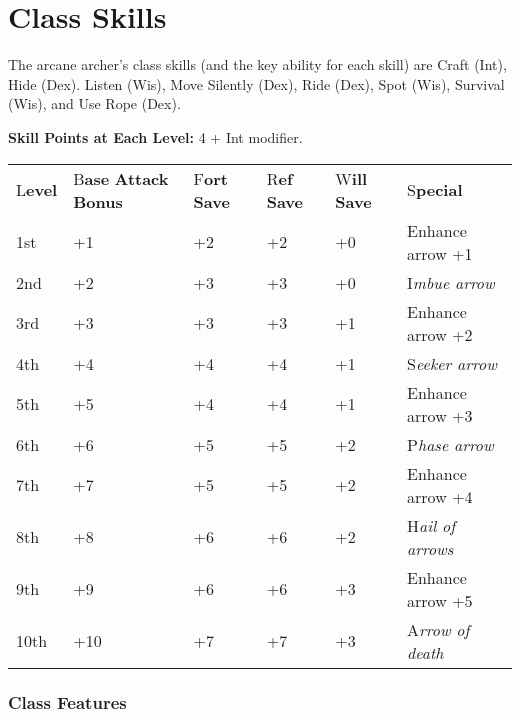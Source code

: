 \documentclass{article}
\begin{document}
\section*{\textbf{Class Skills}}

The arcane archer's class skills (and the key ability for each skill) are Craft 
(Int), Hide (Dex). Listen (Wis), Move Silently (Dex), Ride (Dex), Spot (Wis), Survival 
(Wis), and Use Rope (Dex).

\textbf{Skill Points at Each Level:} 4 + Int modifier.

\vspace{12pt}
\begin{tabular}{|>{\raggedright}p{29pt}|>{\raggedright}p{35pt}|>{\raggedright}p{23pt}|>{\raggedright}p{23pt}|>{\raggedright}p{23pt}|>{\raggedright}p{76pt}|}
\hline
\multicolumn{6}{|p{211pt}|}{\subsection*{T\textbf{able: The Arcane Archer}}}\tabularnewline
\hline
L\textbf{evel } & B\textbf{ase}\linebreak{}
\textbf{Attack}\linebreak{}
\textbf{Bonus} & F\textbf{ort}\linebreak{}
\textbf{Save} & R\textbf{ef}\linebreak{}
\textbf{Save} & W\textbf{ill}\linebreak{}
\textbf{Save} & S\textbf{pecial}\tabularnewline
\hline
1st & +1 & +2 & +2 & +0 & Enhance arrow +1\tabularnewline
\hline
2nd & +2 & +3 & +3 & +0 & I\textit{mbue arrow}\tabularnewline
\hline
3rd & +3 & +3 & +3 & +1 & Enhance arrow +2\tabularnewline
\hline
4th & +4 & +4 & +4 & +1 & S\textit{eeker arrow}\tabularnewline
\hline
5th & +5 & +4 & +4 & +1 & Enhance arrow +3\tabularnewline
\hline
6th & +6 & +5 & +5 & +2 & P\textit{hase arrow}\tabularnewline
\hline
7th & +7 & +5 & +5 & +2 & Enhance arrow +4\tabularnewline
\hline
8th & +8 & +6 & +6 & +2 & H\textit{ail of arrows}\tabularnewline
\hline
9th & +9 & +6 & +6 & +3 & Enhance arrow +5\tabularnewline
\hline
10th & +10 & +7 & +7 & +3 & A\textit{rrow of death}\tabularnewline
\hline
\end{tabular}

\vspace{12pt}
\subsubsection*{\textbf{Class Features}}
\end{document}
